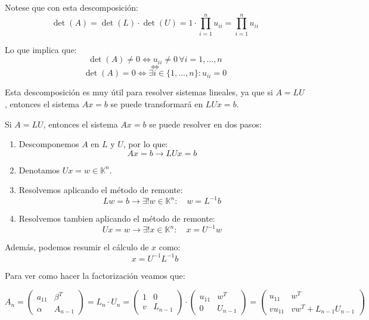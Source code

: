 Notese que con esta descomposición:
\[
    \det(A) = \det(L) \cdot \det(U) = 1 \cdot \prod_{i=1}^n u_{ii} = \prod_{i=1}^n u_{ii}
\]

Lo que implica que:
\[
    \det(A) \neq 0 \iff u_{ii} \neq 0 \, \forall i=1, \ldots, n
\]
\[
    \iff
\]
\[
    \det(A) = 0 \iff \exists i \in \{1, \ldots, n\} : u_{ii} = 0
\]

Esta descomposición es muy útil para resolver sistemas lineales, ya que si $A = LU$, entonces el sistema $Ax = b$ se puede transformará en $LUx = b$.

\begin{proposición}
    Si $A = LU$, entonces el sistema $Ax = b$ se puede resolver en dos pasos:
    \begin{enumerate}
        \item Descomponemos $A$ en $L$ y $U$, por lo que:
        \[
            Ax = b \longrightarrow
            LUx = b
        \]
        \item Denotamos $Ux = w \in \mathbb{K}^n$.
        \item Resolvemos aplicando el método de remonte:
        \[
            Lw = b \longrightarrow
            \exists ! w \in \mathbb{K}^n : \quad
            w = L^{-1}b
        \]
        \item Resolvemos tambien aplicando el método de remonte:
        \[
            Ux = w \longrightarrow
            \exists ! x \in \mathbb{K}^n : \quad
            x = U^{-1}w
        \]
    \end{enumerate}
    Además, podemos resumir el cálculo de $x$ como:
    \[
        x = U^{-1}L^{-1}b
    \]
\end{proposición}

Para ver como hacer la factorización veamos que:

\[
    A_n =
    \left(
    \begin{array}{c|c}
        a_{11} & \beta^T \\ \hline
        \alpha & A_{n-1}
    \end{array}
    \right) =
    L_n \cdot U_n =
    \left(
    \begin{array}{c|c}
        1 & 0 \\ \hline
        v & L_{n-1}
    \end{array}
    \right) \cdot
    \left(
    \begin{array}{c|c}
        u_{11} & w^T \\ \hline
        0 & U_{n-1}
    \end{array}
    \right)
    =
    \left(
    \begin{array}{c|c}
        u_{11} & w^T \\ \hline
        vu_{11} & v w^T + L_{n-1} U_{n-1}
    \end{array}
    \right)
\]

